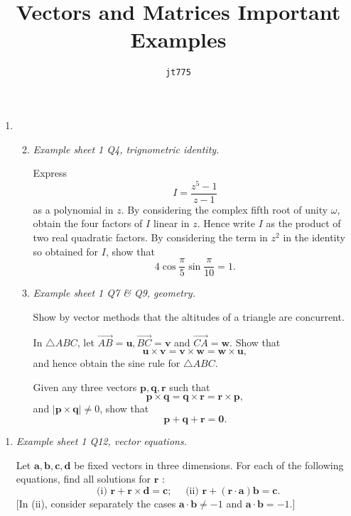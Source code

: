 \documentclass[11pt]{article}
\title{\textbf{Vectors and Matrices Important Examples}}
\author{\texttt{jt775}}
\date{\null}
\newlength{\qspace}
\newcounter{qnumber}
\newenvironment{question}%
 {\vspace{\qspace}
  \begin{enumerate}[\bfseries 1\quad][10]%
    \setcounter{enumi}{\value{qnumber}}%
    \item%
 }
{
  \end{enumerate}
  \filbreak
  \stepcounter{qnumber}
 }
\newenvironment{questionparts}[1][1]%
 {
  \begin{enumerate}[\bfseries (i)]%
    \setcounter{enumii}{#1}
    \addtocounter{enumii}{-1}
    \setlength{\parskip}{3pt}
 }
 {
  \end{enumerate}
 }
\begin{document}
\maketitle
\vspace{-1.5cm}
\begin{question}
    \begin{questionparts}
        \item \textit{Example sheet 1 Q4, trignometric identity.}
    
        Express
        \[
        I=\frac{z^{5}-1}{z-1}
        \]
        as a polynomial in $z$. By considering the complex fifth root of unity $\omega$, obtain the four factors of $I$ linear in $z$. Hence write $I$ as the product of two real quadratic factors. By considering the term in $z^{2}$ in the identity so obtained for $I$, show that
        \[
        4 \cos \frac{\pi}{5} \sin \frac{\pi}{10}=1.
        \]
        \item \textit{Example sheet 1 Q7 \& Q9, geometry.}
        
        Show by vector methods that the altitudes of a triangle are concurrent.

        In $\triangle A B C$, let $\overrightarrow{A B}=\mathbf{u}, \overrightarrow{B C}=\mathbf{v}$ and $\overrightarrow{C A}=\mathbf{w}$. Show that
        \[
        \mathbf{u} \times \mathbf{v}=\mathbf{v} \times \mathbf{w}=\mathbf{w} \times \mathbf{u},
        \]
        and hence obtain the sine rule for $\triangle A B C$.

        Given any three vectors $\mathbf{p}, \mathbf{q}, \mathbf{r}$ such that
        \[
        \mathbf{p} \times \mathbf{q}=\mathbf{q} \times \mathbf{r}=\mathbf{r} \times \mathbf{p},
        \]
        and $|\mathbf{p} \times \mathbf{q}| \neq 0$, show that
        \[
        \mathbf{p}+\mathbf{q}+\mathbf{r}=\mathbf{0}.
        \]
    \end{questionparts}
\end{question}

\begin{question}\textit{Example sheet 1 Q12, vector equations.}
    
    Let $\mathbf{a}, \mathbf{b}, \mathbf{c}, \mathbf{d}$ be fixed vectors in three dimensions. For each of the following equations, find all solutions for $\mathbf{r}$ :
    \[
    \text { (i) } \mathbf{r}+\mathbf{r} \times \mathbf{d}=\mathbf{c} ; \quad \text { (ii) } \mathbf{r}+(\mathbf{r} \cdot \mathbf{a}) \mathbf{b}=\mathbf{c}.
    \]
    [In (ii), consider separately the cases $\mathbf{a} \cdot \mathbf{b} \neq-1$ and $\mathbf{a} \cdot \mathbf{b}=-1 .$]
\end{question}
\end{document}
